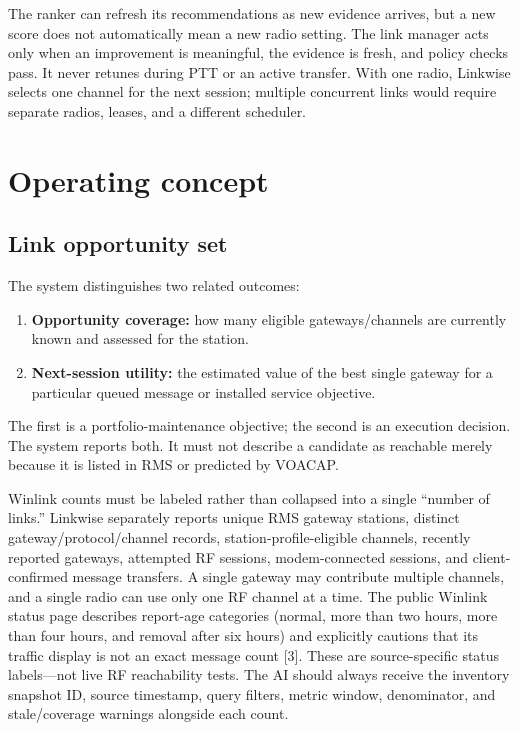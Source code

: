 \documentclass[11pt,a4paper]{article}
\begin{document}
The ranker can refresh its recommendations as new evidence arrives, but a new
score does not automatically mean a new radio setting. The link manager acts
only when an improvement is meaningful, the evidence is fresh, and policy
checks pass. It never retunes during PTT or an active transfer. With one
radio, Linkwise selects one channel for the next session; multiple concurrent
links would require separate radios, leases, and a different scheduler.



\section{Operating concept}

\subsection{Link opportunity set}
The system distinguishes two related outcomes:
\begin{enumerate}
  \item \textbf{Opportunity coverage:} how many eligible gateways/channels are currently known and assessed for the station.
  \item \textbf{Next-session utility:} the estimated value of the best single gateway for a particular queued message or installed service objective.
\end{enumerate}
The first is a portfolio-maintenance objective; the second is an execution decision. The system reports both. It must not describe a candidate as reachable merely because it is listed in RMS or predicted by VOACAP.

Winlink counts must be labeled rather than collapsed into a single “number of links.” Linkwise separately reports unique RMS gateway stations, distinct gateway/protocol/channel records, station-profile-eligible channels, recently reported gateways, attempted RF sessions, modem-connected sessions, and client-confirmed message transfers. A single gateway may contribute multiple channels, and a single radio can use only one RF channel at a time. The public Winlink status page describes report-age categories (normal, more than two hours, more than four hours, and removal after six hours) and explicitly cautions that its traffic display is not an exact message count [3]. These are source-specific status labels—not live RF reachability tests. The AI should always receive the inventory snapshot ID, source timestamp, query filters, metric window, denominator, and stale/coverage warnings alongside each count.
\end{document}
